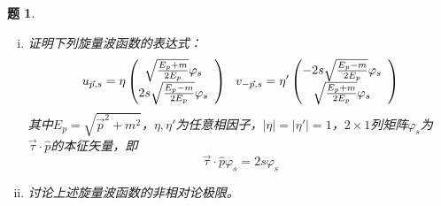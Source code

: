 \documentclass[UTF8,10pt,a4paper]{article}
\theoremstyle{Problem}%
\newtheorem{prob}{题}%
\theoremstyle{Solution}%
\begin{document}
\thispagestyle{FirstPageStyle}%
\begin{prob}
    \begin{enumerate}[(i)]
        \item 证明下列旋量波函数的表达式：
        \[
            u_{\vec{p},s} = \eta \left(\begin{array}{@{}c}
                \sqrt{\frac{E_p+m}{2E_p}}\varphi_s \\
                2s\sqrt{\frac{E_p-m}{2E_p}}\varphi_s
            \end{array}
            \right) 
            ~~ 
            v_{-\vec{p},s} = \eta' \left(\begin{array}{@{}c}
                -2s\sqrt{\frac{E_p-m}{2E_p}} \varphi_s \\
                \sqrt{\frac{E_p+m}{2E_p}}\varphi_s
            \end{array}\right)
        \]
        其中$E_p = \sqrt{\vec{p}^2 + m^2}$，$\eta,\eta'$为任意相因子，$\vert \eta \vert = \vert \eta' \vert = 1$，$2\times 1$列矩阵$\varphi_s$为$\vec{\tau}\cdot\hat{p}$的本征矢量，即
        \[
            \vec{\tau}\cdot \hat{p} \varphi_s = 2s \varphi_s
        \]

        \item 讨论上述旋量波函数的非相对论极限。
    \end{enumerate}
\end{prob}
\end{document}
